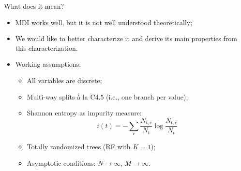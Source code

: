 \documentclass{beamer}
\begin{document}
\begin{frame}{What does it mean?}
\begin{itemize}
\item MDI works well, but it is not well understood theoretically;
\item We would like to better characterize it and derive its main
  properties from this characterization.

\bigskip

\item Working assumptions:
\begin{itemize}
\item All variables are discrete;
\item Multi-way splits \`a la C4.5 (i.e., one branch per value);
\item Shannon entropy as impurity measure:
$$i(t) = - \sum_{c} \frac{N_{t,c}}{N_t} \log \frac{N_{t,c}}{N_t}$$
\item {\color{red} Totally randomized trees (RF with $K=1$);}
\item {\color{red} Asymptotic conditions: $N\to \infty$, $M\to \infty$.}
\end{itemize}
\end{itemize}
\end{frame}
\end{document}
